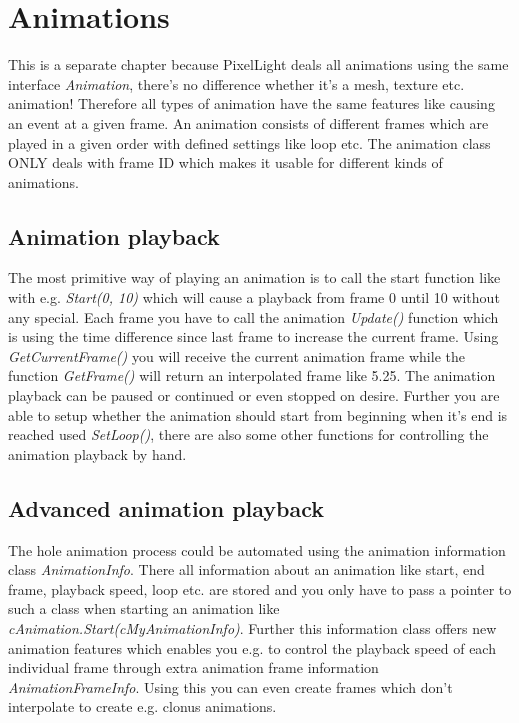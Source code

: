 \section{Animations}
This is a separate chapter because PixelLight deals all animations using the same interface \emph{Animation}, there's no difference whether it's a mesh, texture etc. animation! Therefore all types of animation have the same features like causing an event at a given frame. An animation consists of different frames which are played in a given order with defined settings like loop etc. The animation class ONLY deals with frame ID which makes it usable for different kinds of animations.




\subsection{Animation playback}
The most primitive way of playing an animation is to call the start function like with e.g. \emph{Start(0, 10)} which will cause a playback from frame 0 until 10 without any special. Each frame you have to call the animation \emph{Update()} function which is using the time difference since last frame to increase the current frame. Using \emph{GetCurrentFrame()} you will receive the current animation frame while the function \emph{GetFrame()} will return an interpolated frame like 5.25. The animation playback can be paused or continued or even stopped on desire. Further you are able to setup whether the animation should start from beginning when it's end is reached used \emph{SetLoop()}, there are also some other functions for controlling the animation playback by hand.




\subsection{Advanced animation playback}
The hole animation process could be automated using the animation information class \emph{AnimationInfo}. There all information about an animation like start, end frame, playback speed, loop etc. are stored and you only have to pass a pointer to such a class when starting an animation like \emph{cAnimation.Start(cMyAnimationInfo)}. Further this information class offers new animation features which enables you e.g. to control the playback speed of each individual frame through extra animation frame information \emph{AnimationFrameInfo}. Using this you can even create frames which don't interpolate to create e.g. clonus animations.
